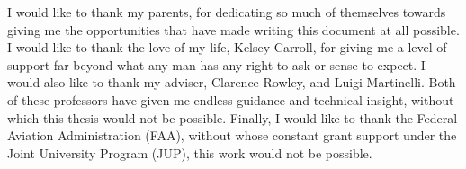 
I would like to thank my parents, for dedicating so much of themselves
towards giving me the opportunities that have made writing this
document at all possible. I would like to thank the love of my life,
Kelsey Carroll, for giving me a level of support far beyond what any
man has any right to ask or sense to expect. I would also like to
thank my adviser, Clarence Rowley, and Luigi Martinelli. Both of these
professors have given me endless guidance and technical insight,
without which this thesis would not be possible. Finally, I would like
to thank the Federal Aviation Administration (FAA), without whose
constant grant support under the Joint University Program (JUP), this
work would not be possible.
